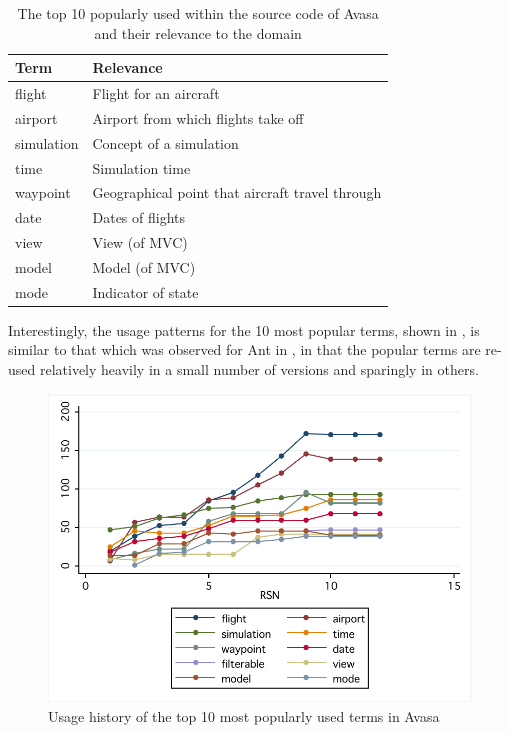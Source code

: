 \begin{table}[t]
\centering
\begin{tabular}{|p{}|l|}
\hline
{\bf Term} & {\bf Relevance} \\
\hline
\hline
flight & Flight for an aircraft \\
\hline
airport & Airport from which flights take off \\
\hline
simulation & Concept of a simulation \\
\hline
time & Simulation time \\
\hline
waypoint & Geographical point that aircraft travel through \\
\hline
date & Dates of flights \\
\hline
view & View (of MVC) \\
\hline
model & Model (of MVC) \\
\hline
mode & Indicator of state \\
\hline
\end{tabular}
\vspace{0.2cm}
\caption{The top 10 popularly used within the source code of Avasa and their relevance to the domain}
\label{tab:avasa_popular_terms}
\vspace{-0.2cm}
\end{table}

Interestingly, the usage patterns for the 10 most popular terms, shown in , is similar to that which was observed for Ant in , in that the popular terms are re-used relatively heavily in a small number of versions and sparingly in others.

\begin{figure}[t]
\centering
\includegraphics[width=\textwidth]{Figures/Vocab-AvasaPopular.pdf}
\caption{Usage history of the top 10 most popularly used terms in Avasa}
\label{fig:avasa_popular_terms_history}
\end{figure}

